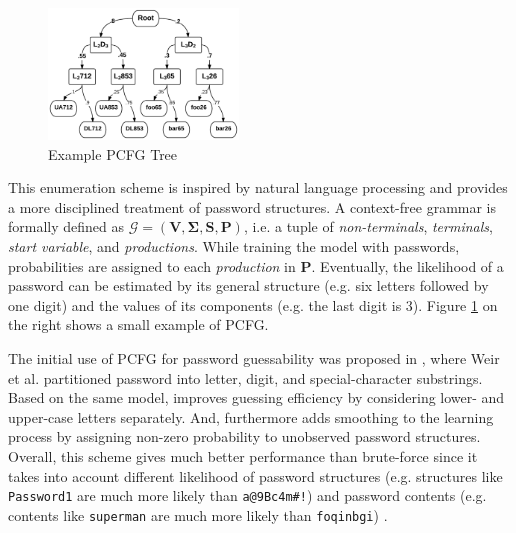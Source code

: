 \documentclass{article} %
\theoremstyle{definition}
\theoremstyle{theorem}
\theoremstyle{remark}
\theoremstyle{remark}
\begin{document}
\begin{figure}
    \vspace{-35pt}
    \begin{center}
        \includegraphics[width=0.45\textwidth]{diag/pcfg.png}
    \end{center}
    \vspace{-10pt}
    \caption{Example PCFG Tree}
    \vspace{-20pt}
    \label{fig:pcfg}
\end{figure}

\par\quad This enumeration scheme is inspired by natural language processing \cite{pcfg} and provides a more disciplined treatment of password structures. A context-free grammar is formally defined as $\mathcal{G}=(\bm{V}, \bm{\Sigma}, \bm{S}, \bm{P})$, i.e. a tuple of \emph{non-terminals}, \emph{terminals}, \emph{start variable}, and \emph{productions}. While training the model with passwords, probabilities are assigned to each \emph{production} in $\bm{P}$. Eventually, the likelihood of a password can be estimated by its general structure (e.g. six letters followed by one digit) and the values of its components (e.g. the last digit is $3$). Figure \ref{fig:pcfg} on the right shows a small example of PCFG.

\par\quad The initial use of PCFG for password guessability was proposed in \cite{PCFG}, where Weir et al. partitioned password into letter, digit, and special-character substrings. Based on the same model, \cite{againagain} improves guessing efficiency by considering lower- and upper-case letters separately. And, \cite{pcfg-smoothing} furthermore adds smoothing to the learning process by assigning non-zero probability to unobserved password structures. Overall, this scheme gives much better performance than brute-force since it takes into account different likelihood of password structures (e.g. structures like \texttt{Password1} are much more likely than \texttt{a@9Bc4m\#!}) and password contents (e.g. contents like \texttt{superman} are much more likely than \texttt{foqinbgi}) \cite{guessability}.
\end{document}
